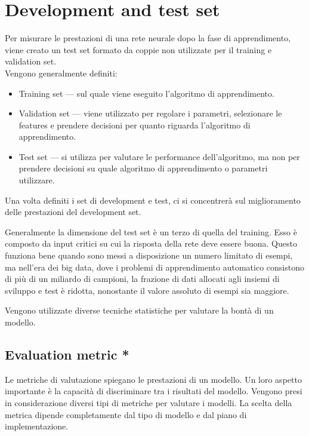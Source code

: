 \section{Development and test set}
\label{sec:DevelopmentAndTestSet}
Per misurare le prestazioni di una rete neurale dopo la fase di apprendimento, viene creato un test set formato da coppie non utilizzate per il training e validation set.\\
Vengono generalmente definiti: 
\begin{itemize}
	\item Training set --- sul quale viene eseguito l'algoritmo di apprendimento.
	\item Validation set --- viene utilizzato per regolare i parametri, selezionare le features e prendere decisioni per quanto riguarda l'algoritmo di apprendimento.
	\item Test set --- si utilizza per valutare le performance dell'algoritmo, ma non per prendere decisioni su quale algoritmo di apprendimento o parametri utilizzare. 
\end{itemize}

Una volta definiti i set di development e test, ci si concentrerà sul miglioramento delle prestazioni del development set. 

Generalmente la dimensione del test set è un terzo di quella del training. Esso è composto da input critici su cui la risposta della rete deve essere buona. 
Questo funziona bene quando sono messi a disposizione un numero limitato di esempi, ma nell'era dei big data, dove i problemi di apprendimento automatico consistono di più di un miliardo di campioni, la frazione di dati allocati agli insiemi di sviluppo e test è ridotta, nonostante il valore assoluto di esempi sia maggiore.

Vengono utilizzate diverse tecniche statistiche per valutare la bontà di un modello.

\subsection{Evaluation metric *}
\label{subsec:EvaluationMetric}

Le metriche di valutazione spiegano le prestazioni di un modello. Un loro aspetto importante è la capacità di discriminare tra i risultati del modello.
Vengono presi in considerazione diversi tipi di metriche per valutare i modelli. La scelta della metrica dipende completamente dal tipo di modello e dal piano di implementazione. 

